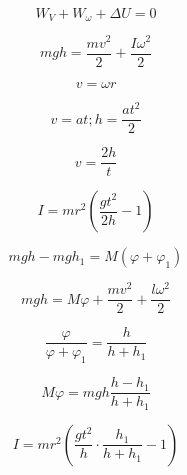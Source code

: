\begin{equation}
    W_V + W_{\omega} + \Delta U = 0
\end{equation}

\begin{equation}
    mgh = \frac{mv^2}{2} + \frac{I\omega^2}{2}
\end{equation}

\begin{equation}
  v = \omega r 
\end{equation}

\begin{equation}
 v = at; h = \frac{at^2}{2}
\end{equation}

\begin{equation}
 v = \frac{2h}{t}
\end{equation}

\begin{equation}
  I = mr^2(\frac{gt^2}{2h} - 1)
\end{equation}

\begin{equation}
    mgh - mgh_1 = M(\varphi  + \varphi_1)
\end{equation}

\begin{equation}
 mgh = M\varphi + \frac{mv^2}{2} + \frac{l\omega^2}{2}
\end{equation}

\begin{equation}
 \frac{\varphi}{\varphi + \varphi_1} = \frac{h}{h+h_1}
\end{equation}

\begin{equation}
 M \varphi = mgh \frac{h-h_1}{h+h_1}
\end{equation}

\begin{equation}
 I = mr^2 (\frac{gt^2}{h} \cdot \frac{h_1}{h+h_1} - 1)
\end{equation}

